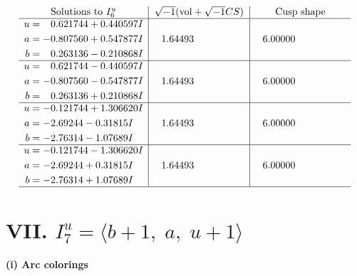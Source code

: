 \documentclass[1p]{elsarticle_modified}
\theoremstyle{definition}
\newcommand{\I}{\sqrt{-1}}
\begin{document}
$$\begin{array}{c|c|c}  
\text{Solutions to }I^u_{6}& \I (\text{vol} + \sqrt{-1}CS) & \text{Cusp shape}\\
 \hline 
\begin{aligned}
u &= \phantom{-}0.621744 + 0.440597 I \\
a &= -0.807560 + 0.547877 I \\
b &= \phantom{-}0.263136 - 0.210868 I\end{aligned}
 & \phantom{-}1.64493\phantom{ +0.000000I} & \phantom{-}6.00000\phantom{ +0.000000I} \\ \hline\begin{aligned}
u &= \phantom{-}0.621744 - 0.440597 I \\
a &= -0.807560 - 0.547877 I \\
b &= \phantom{-}0.263136 + 0.210868 I\end{aligned}
 & \phantom{-}1.64493\phantom{ +0.000000I} & \phantom{-}6.00000\phantom{ +0.000000I} \\ \hline\begin{aligned}
u &= -0.121744 + 1.306620 I \\
a &= -2.69244 - 0.31815 I \\
b &= -2.76314 - 1.07689 I\end{aligned}
 & \phantom{-}1.64493\phantom{ +0.000000I} & \phantom{-}6.00000\phantom{ +0.000000I} \\ \hline\begin{aligned}
u &= -0.121744 - 1.306620 I \\
a &= -2.69244 + 0.31815 I \\
b &= -2.76314 + 1.07689 I\end{aligned}
 & \phantom{-}1.64493\phantom{ +0.000000I} & \phantom{-}6.00000\phantom{ +0.000000I}\\
 \hline 
 \end{array}$$\newpage\newpage\renewcommand{\arraystretch}{1}
\centering \section*{VII. $I^u_{7}= \langle b+1,\;a,\;u+1 \rangle$}
\flushleft \textbf{(i) Arc colorings}\\
\end{document}
